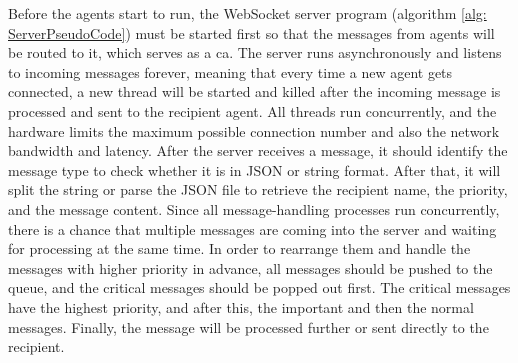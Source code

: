 Before the agents start to run, the WebSocket server program (algorithm \ref{alg: ServerPseudoCode}) must be started first so that the messages from agents will be routed to it, which serves as a \gls{ca}.  
The server runs asynchronously and listens to incoming messages forever, meaning that every time a new agent gets connected, a new thread will be started and killed after the incoming message is processed and sent to the recipient agent. 
All threads run concurrently, and the hardware limits the maximum possible connection number and also the network bandwidth and latency. 
After the server receives a message, it should identify the message type to check whether it is in JSON or string format. 
After that, it will split the string or parse the JSON file to retrieve the recipient name, the priority, and the message content. 
Since all message-handling processes run concurrently, there is a chance that multiple messages are coming into the server and waiting for processing at the same time. 
In order to rearrange them and handle the messages with higher priority in advance, all messages should be pushed to the queue, and the critical messages should be popped out first. The critical messages have the highest priority, and after this, the important and then the normal messages. 
Finally, the message will be processed further or sent directly to the recipient. 
   
